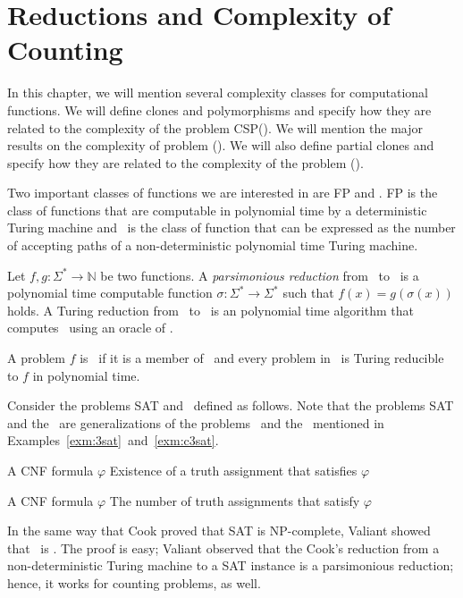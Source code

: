 \chapter{Reductions and Complexity of Counting}
In this chapter, we will mention several complexity classes for computational functions.
We will define clones and polymorphisms and specify how they are related to
the complexity of the problem CSP(\mrelset). We will mention the major results on the complexity of 
problem \ccsp(\mrelset). We will also define partial clones and specify
how they are related to the complexity of the problem \ccsp(\mrelset).

Two important classes of functions we are interested in are FP and \cp\@.
FP is the class of functions that are computable in polynomial time by a deterministic Turing machine
and \cp\ is the class of function that can be expressed as the
number of accepting paths of a non-deterministic polynomial time Turing machine. 

Let \(f,g:\Sigma^*\to\mathbb{N}\) be two functions. A \emph{parsimonious reduction}
from \mf\ to \mg\ is a polynomial time computable function
\(\sigma:\Sigma^*\to\Sigma^*\) such that
\(f(x)=g(\sigma(x))\) holds. 
A Turing reduction from \mf\ to \mg\ is an polynomial time algorithm
that computes \mf\ using an oracle of \mg\@.

\begin{defi} 
A problem \(f\) is \cpc\ if it is a member of \cp\ and every problem in \cp\ is 
Turing reducible to \(f\) in polynomial time.
\end{defi}

Consider the problems SAT and \csat\ defined as follows.
Note that the problems SAT and the \csat\ are generalizations of the problems \tsat\ and
the \ctsat\ mentioned in Examples~\ref{exm:3sat}~and~\ref{exm:c3sat}\@. 

{A CNF formula \(\varphi\)}
{Existence of a truth assignment that satisfies \(\varphi\)}

\pdef{\csat}
{A CNF formula \(\varphi\)}
{The number of truth assignments that satisfy \(\varphi\)}

In the same way that Cook \cite{cook1971} proved that SAT is NP-complete,
Valiant \cite{Valiant1979} showed that \csat\ is \cpc\@. 
The proof is easy; Valiant observed that the Cook's reduction from a non-deterministic Turing machine
to a SAT instance is a parsimonious reduction; hence, it works for counting problems, as well. 

